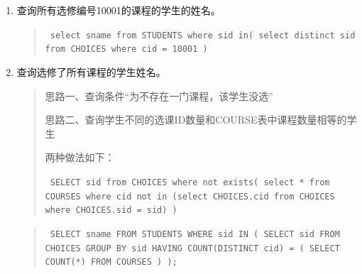 \documentclass[a4paper,twoside]{article}
\begin{document}
\begin{spacing}{1.2}
\begin{enumerate}
\item 查询所有选修编号10001的课程的学生的姓名。
\begin{quote}
\texttt{
select sname from STUDENTS where sid in(
select distinct sid from CHOICES where cid = 10001
)
}
\end{quote}
\item 查询选修了所有课程的学生姓名。
\begin{quote}

思路一、查询条件“为不存在一门课程，该学生没选”

思路二、查询学生不同的选课ID数量和COURSE表中课程数量相等的学生

两种做法如下：

\texttt{
SELECT sid from CHOICES 
where not exists(
select * from COURSES where
cid not in (select CHOICES.cid from CHOICES where CHOICES.sid = sid)
)
}
\end{quote}
\begin{quote}
\texttt{
SELECT sname
FROM STUDENTS
WHERE sid IN (
  SELECT sid
  FROM CHOICES
  GROUP BY sid
  HAVING COUNT(DISTINCT cid) = (
    SELECT COUNT(*) FROM COURSES
  )
);
}
\end{quote}


\end{enumerate}
\end{spacing}
\end{document}
